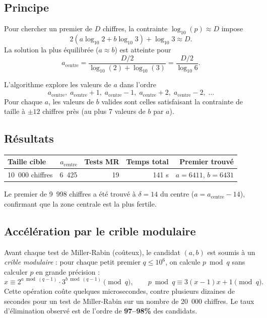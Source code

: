 \documentclass[12pt,a4paper]{article}
\theoremstyle{definition}
\begin{document}
\subsection{Principe}

Pour chercher un premier de $D$ chiffres, la contrainte
$\log_{10}(p) \approx D$ impose
\[
  2(a \log_{10} 2 + b \log_{10} 3) + \log_{10} 3 \approx D.
\]
La solution la plus équilibrée ($a \approx b$) est atteinte pour
\[
  a_{\text{centre}} = \frac{D/2}{\log_{10}(2) + \log_{10}(3)}
  = \frac{D/2}{\log_{10} 6}.
\]

L'algorithme explore les valeurs de $a$ dans l'ordre
\[
  a_{\text{centre}},\;
  a_{\text{centre}}+1,\;
  a_{\text{centre}}-1,\;
  a_{\text{centre}}+2,\;
  a_{\text{centre}}-2,\;\ldots
\]
Pour chaque $a$, les valeurs de $b$ valides sont celles satisfaisant
la contrainte de taille à $\pm 12$ chiffres près
(au plus 7 valeurs de $b$ par $a$).

\subsection{Résultats}

\begin{center}
\renewcommand{\arraystretch}{1.2}
\begin{tabular}{lrrrr}
  \toprule
  Taille cible & $a_{\text{centre}}$ & Tests MR & Temps total & Premier trouvé \\
  \midrule
  10~000 chiffres & 6~425 & 19 & 141 s & $a=6411$, $b=6431$ \\
  \bottomrule
\end{tabular}
\end{center}

Le premier de 9~998 chiffres a été trouvé à $\delta = 14$ du centre
($a = a_{\text{centre}} - 14$), confirmant que la zone centrale
est la plus fertile.

\subsection{Accélération par le crible modulaire}

Avant chaque test de Miller-Rabin (coûteux), le candidat $(a,b)$
est soumis à un \emph{crible modulaire} :
pour chaque petit premier $q \leq 10^6$,
on calcule $p \bmod q$ sans calculer $p$ en grande précision :
\[
  x \equiv 2^{a \bmod (q-1)} \cdot 3^{b \bmod (q-1)} \pmod{q},
  \qquad
  p \bmod q \equiv 3(x-1)x + 1 \pmod{q}.
\]
Cette opération coûte quelques microsecondes, contre plusieurs dizaines
de secondes pour un test de Miller-Rabin sur un nombre de 20~000 chiffres.
Le taux d'élimination observé est de l'ordre de \textbf{97--98\%} des candidats.
\end{document}
